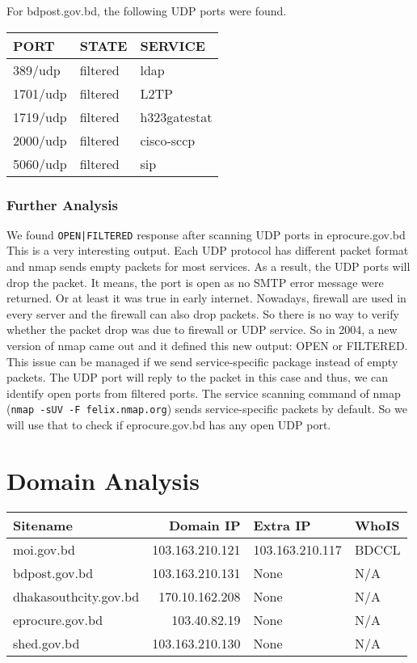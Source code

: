 \documentclass[11pt]{article}
\begin{document}
For bdpost.gov.bd, the following UDP ports were found.\\
\begin{center}
\begin{tabular}{lll}
PORT & STATE & SERVICE\\
\hline
389/udp & filtered & ldap\\
1701/udp & filtered & L2TP\\
1719/udp & filtered & h323gatestat\\
2000/udp & filtered & cisco-sccp\\
5060/udp & filtered & sip\\
\end{tabular}
\end{center}
\subsubsection{Further Analysis}
\label{sec:orgfc7ffbc}
We found \texttt{OPEN|FILTERED} response after scanning UDP ports in eprocure.gov.bd This is a very interesting output. Each UDP protocol has different packet format and nmap sends empty packets for most services. As a result, the UDP ports will drop the packet. It means, the port is open as no SMTP error message were returned. Or at least it was true in early internet. Nowadays, firewall are used in every server and the firewall can also drop packets. So there is no way to verify whether the packet drop was due to firewall or UDP service. So in 2004, a new version of nmap came out and it defined this new output: OPEN or FILTERED.\\

This issue can be managed if we send service-specific package instead of empty packets. The UDP port will reply to the packet in this case and thus, we can identify open ports from filtered ports. The service scanning command of nmap (\texttt{nmap -sUV -F felix.nmap.org}) sends service-specific packets by default. So we will use that to check if eprocure.gov.bd has any open UDP port.\\
\section{Domain Analysis}
\label{sec:orge1c656d}
\begin{center}
\begin{tabular}{lrll}
Sitename & Domain IP & Extra IP & WhoIS\\
\hline
moi.gov.bd & 103.163.210.121 & 103.163.210.117 & BDCCL\\
bdpost.gov.bd & 103.163.210.131 & None & N/A\\
dhakasouthcity.gov.bd & 170.10.162.208 & None & N/A\\
eprocure.gov.bd & 103.40.82.19 & None & N/A\\
shed.gov.bd & 103.163.210.130 & None & N/A\\
\end{tabular}
\end{center}
\end{document}
